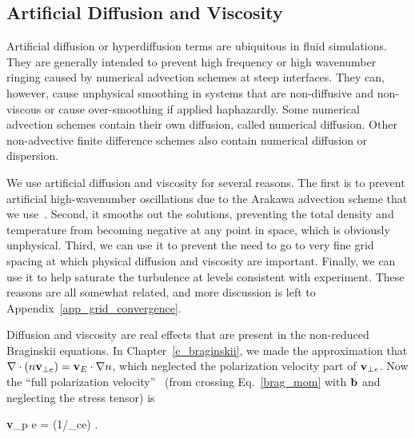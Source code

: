 \subsection{Artificial Diffusion and Viscosity}
\label{ss_art_diff}

Artificial diffusion or hyperdiffusion terms are ubiquitous in fluid simulations. They are generally intended to prevent high frequency or high wavenumber ringing caused by numerical advection
schemes at steep interfaces. They can, however, cause unphysical smoothing in systems that are non-diffusive and non-viscous or cause over-smoothing if applied haphazardly. Some numerical
advection schemes contain their own diffusion, called numerical diffusion. Other non-advective finite difference schemes also contain numerical diffusion or dispersion.

We use artificial diffusion and viscosity for several reasons. The first is to prevent artificial high-wavenumber oscillations due to the Arakawa advection scheme that we use~\cite{arakawa1966}.
Second, it smooths out the solutions, preventing the total density and temperature from becoming negative at any point in space, which is obviously unphysical. Third, we can use it
to prevent the need to go to very fine grid spacing at which physical diffusion and viscosity are important. Finally, we can use it to help saturate the turbulence at levels consistent with experiment.
These reasons are all somewhat related, and more discussion is left to Appendix~\ref{app_grid_convergence}.

Diffusion and viscosity are real effects that are present in the non-reduced Braginskii equations. In Chapter~\ref{c_braginskii}, we made the approximation that 
$\nabla \cdot (n {\bf v}_{\perp e}) = {\bf v}_{E} \cdot \nabla n$, which neglected the polarization velocity part of ${\bf v}_{\perp e}$. Now the ``full polarization velocity''~\cite{simakov2003}
(from crossing Eq.~\ref{brag_mom} with ${\bf b}$ and neglecting the stress tensor) is

\beq
\label{e_pol_v}
{\bf v}_{p e} = (1/\omega_{ce}) .
\eeq

